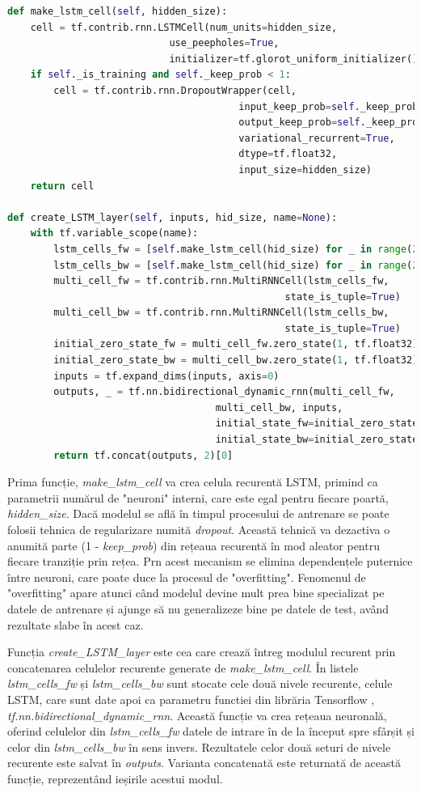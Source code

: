 \documentclass[a4paper,12pt]{book}
\begin{document}
				\begin{lstlisting}[language=Python, caption={Implementarea celulelor LSTM bidirectionale pe doua nivele folosind procedurile specifice ale librariei Tensorflow.}, xleftmargin=0cm]
def make_lstm_cell(self, hidden_size):
	cell = tf.contrib.rnn.LSTMCell(num_units=hidden_size, 
							use_peepholes=True, 		
							initializer=tf.glorot_uniform_initializer())
	if self._is_training and self._keep_prob < 1:
		cell = tf.contrib.rnn.DropoutWrapper(cell, 
										input_keep_prob=self._keep_prob,
										output_keep_prob=self._keep_prob, 
										variational_recurrent=True, 
										dtype=tf.float32, 
										input_size=hidden_size)
	return cell

def create_LSTM_layer(self, inputs, hid_size, name=None):
	with tf.variable_scope(name):
		lstm_cells_fw = [self.make_lstm_cell(hid_size) for _ in range(2)]
		lstm_cells_bw = [self.make_lstm_cell(hid_size) for _ in range(2)]
		multi_cell_fw = tf.contrib.rnn.MultiRNNCell(lstm_cells_fw, 
												state_is_tuple=True)
		multi_cell_bw = tf.contrib.rnn.MultiRNNCell(lstm_cells_bw, 
												state_is_tuple=True)
		initial_zero_state_fw = multi_cell_fw.zero_state(1, tf.float32)
		initial_zero_state_bw = multi_cell_bw.zero_state(1, tf.float32)
		inputs = tf.expand_dims(inputs, axis=0)
		outputs, _ = tf.nn.bidirectional_dynamic_rnn(multi_cell_fw, 
									multi_cell_bw, inputs, 
									initial_state_fw=initial_zero_state_fw, 
									initial_state_bw=initial_zero_state_bw)
		return tf.concat(outputs, 2)[0]				\end{lstlisting}
		Prima funcție, \textit{make\_lstm\_cell} va crea celula recurentă LSTM, primind ca parametrii numărul de "neuroni" interni, care este egal pentru fiecare poartă, \textit{hidden\_size}. Dacă modelul se află în timpul procesului de antrenare se poate folosii tehnica de regularizare numită \textit{dropout}. Această tehnică va dezactiva o anumită parte (1 - \textit{keep\_prob}) din rețeaua recurentă în mod aleator pentru fiecare tranziție prin rețea. Prn acest mecanism se elimina dependențele puternice între neuroni, care poate duce la procesul de "overfitting". Fenomenul de "overfitting" apare atunci când modelul devine mult prea bine specializat pe datele de antrenare și ajunge să nu generalizeze bine pe datele de test, având rezultate slabe în acest caz. \par
		Funcția \textit{create\_LSTM\_layer} este cea care crează întreg modulul recurent prin concatenarea celulelor recurente generate de  \textit{make\_lstm\_cell}. În listele \textit{lstm\_cells\_fw} și \textit{lstm\_cells\_bw} sunt stocate cele două nivele recurente, celule LSTM,  care sunt date apoi ca parametru functiei din librăria Tensorflow \cite{tensorflow}, \textit{tf.nn.bidirectional\_dynamic\_rnn}. Această funcție va crea rețeaua neuronală, oferind celulelor din \textit{lstm\_cells\_fw} datele de intrare în de la început spre sfârșit și celor din \textit{lstm\_cells\_bw} în sens invers. Rezultatele celor două seturi de nivele recurente este salvat în \textit{outputs}. Varianta concatenată este returnată de această funcție, reprezentând ieșirile acestui modul. \par
		
\end{document}
